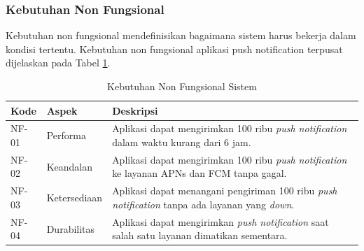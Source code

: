 \subsubsection{Kebutuhan Non Fungsional}
\par Kebutuhan non fungsional mendefinisikan bagaimana sistem harus bekerja dalam kondisi tertentu. Kebutuhan non fungsional aplikasi push notification terpusat dijelaskan pada Tabel \ref{t:non_fungsional}.
\begin{longtable}{|p{1.2cm}|p{2cm}|p{5.5cm}|}
	\caption{Kebutuhan Non Fungsional Sistem} \label{t:non_fungsional} \\ \hline
    \rowcolor{lightgray} Kode & Aspek & Deskripsi \\ \hline
    NF-01 & Performa & Aplikasi dapat mengirimkan 100 ribu \textit{push notification} dalam waktu kurang dari 6 jam. \\ \hline
    NF-02 & Keandalan & Aplikasi dapat mengirimkan 100 ribu \textit{push notification} ke layanan APNs dan FCM tanpa gagal. \\ \hline
    NF-03 & Ketersediaan & Aplikasi dapat menangani pengiriman 100 ribu \textit{push notification} tanpa ada layanan yang \textit{down}. \\ \hline
    NF-04 & Durabilitas & Aplikasi dapat mengirimkan \textit{push notification} saat salah satu layanan dimatikan sementara. \\ \hline
\end{longtable}

